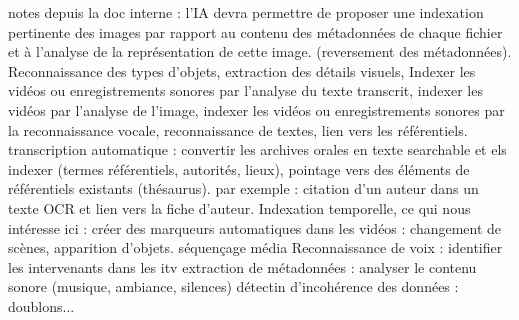 \begin{itemize}
notes depuis la doc interne :
l'IA devra permettre de proposer une indexation pertinente des images par rapport au contenu des métadonnées de chaque fichier et à l'analyse de la représentation de cette image. (reversement des métadonnées). Reconnaissance des types d'objets, extraction des détails visuels, 
Indexer les vidéos ou enregistrements sonores par l'analyse du texte transcrit, indexer les vidéos par l'analyse de l'image, indexer les vidéos ou enregistrements sonores par la reconnaissance vocale, reconnaissance de textes, lien vers les référentiels. 
transcription automatique : convertir les archives orales en texte searchable et els indexer (termes référentiels, autorités, lieux), pointage vers des éléments de référentiels existants (thésaurus). par exemple : citation d'un auteur dans un texte OCR et lien vers la fiche d'auteur. 
Indexation temporelle, ce qui nous intéresse ici : créer des marqueurs automatiques dans les vidéos : changement de scènes, apparition d'objets. séquençage média
Reconnaissance de voix : identifier les intervenants dans les itv
extraction de métadonnées : analyser le contenu sonore (musique, ambiance, silences)
détectin d'incohérence des données : doublons...

\end{itemize}